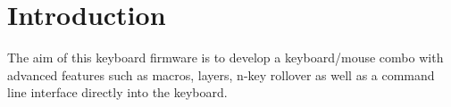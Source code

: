 \hypertarget{index_intro_sec}{}\section{Introduction}\label{index_intro_sec}
The aim of this keyboard firmware is to develop a keyboard/mouse combo with advanced features such as macros, layers, n-\/key rollover as well as a command line interface directly into the keyboard. 